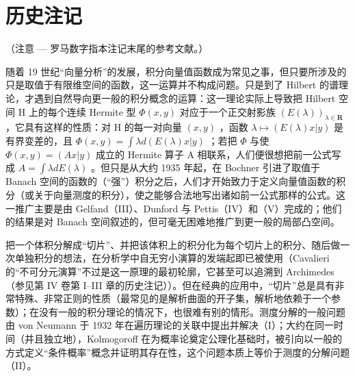 \chapter*{历史注记}
{}

（注意 --- 罗马数字指本注记末尾的参考文献。）

随着 19 世纪“向量分析”的发展，积分向量值函数成为常见之事，但只要所涉及的只是取值于有限维空间的函数，这一运算并不构成问题。只是到了 Hilbert 的谱理论，才遇到自然导向更一般的积分概念的运算：这一理论实际上导致把 Hilbert 空间 H 上的每个连续 Hermite 型 \(\Phi(x,y)\) 对应于一个正交射影族 \((E(\lambda))_{\lambda\in\mathbf{R}}\) ，它具有这样的性质：对 H 的每一对向量 \((x,y)\) ，函数 \(\lambda\mapsto(E(\lambda)x|y)\) 是有界变差的，且 \(\Phi(x,y)=\int\lambda d(E(\lambda)x|y)\) ；若把 \(\Phi\) 与使 \(\Phi(x,y)=(Ax|y)\) 成立的 Hermite 算子 A 相联系，人们便很想把前一公式写成 \(A=\int\lambda dE(\lambda)\) 。但只是从大约 1935 年起，在 Bochner 引进了取值于 Banach 空间的函数的（“强”）积分之后，人们才开始致力于定义向量值函数的积分（或关于向量测度的积分），使之能够合法地写出诸如前一公式那样的公式。这一推广主要是由 Gelfand（III）、Dunford 与 Pettis（IV）和（V）完成的；他们的结果是对 Banach 空间叙述的，但可毫无困难地推广到更一般的局部凸空间。

把一个体积分解成“切片”、并把该体积上的积分化为每个切片上的积分、随后做一次单独积分的想法，在分析学中自无穷小演算的发端起即已被使用（Cavalieri 的“不可分元演算”不过是这一原理的最初轮廓，它甚至可以追溯到 Archimedes（参见第 IV 卷第 I--III 章的历史注记））。但在经典的应用中，“切片”总是具有非常特殊、非常正则的性质（最常见的是解析曲面的开子集，解析地依赖于一个参数）；在没有一般的积分理论的情况下，也很难有别的情形。测度分解的一般问题由 von Neumann 于 1932 年在遍历理论的关联中提出并解决（I）；大约在同一时间（并且独立地），Kolmogoroff 在为概率论奠定公理化基础时，被引向以一般的方式定义“条件概率”概念并证明其存在性，这个问题本质上等价于测度的分解问题（II）。

